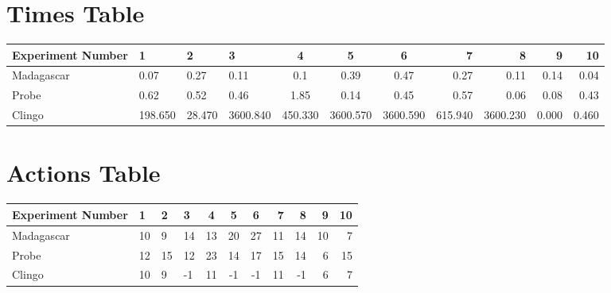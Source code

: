 \documentclass[8pt]{article}
\begin{document}
\begin{landscape}
\section{Times Table}\begin{tabular}{ | l | l | l | l | c | c | c | r | r | r | r | }\hline
Experiment Number & 1 & 2 & 3 & 4 & 5 & 6 & 7 & 8 & 9 & 10\\  \hline
Madagascar & 0.07 & 0.27 & 0.11 & 0.1 & 0.39 & 0.47 & 0.27 & 0.11 & 0.14 & 0.04\\  \hline
Probe & 0.62 & 0.52 & 0.46 & 1.85 & 0.14 & 0.45 & 0.57 & 0.06 & 0.08 & 0.43\\  \hline
Clingo & 198.650 & 28.470 & 3600.840 & 450.330 & 3600.570 & 3600.590 & 615.940 & 3600.230 & 0.000 & 0.460\\  \hline
\end{tabular}
\section{Actions Table}\begin{tabular}{ | l | l | l | l | c | c | c | r | r | r | r | }\hline
Experiment Number & 1 & 2 & 3 & 4 & 5 & 6 & 7 & 8 & 9 & 10\\ \hline
 Madagascar & 10 & 9 & 14 & 13 & 20 & 27 & 11 & 14 & 10 & 7\\ \hline
 Probe & 12 & 15 & 12 & 23 & 14 & 17 & 15 & 14 & 6 & 15\\ \hline
 Clingo & 10 & 9 & -1 & 11 & -1 & -1 & 11 & -1 & 6 & 7\\ \hline
\end{tabular}
\end{landscape}
\end{document}

